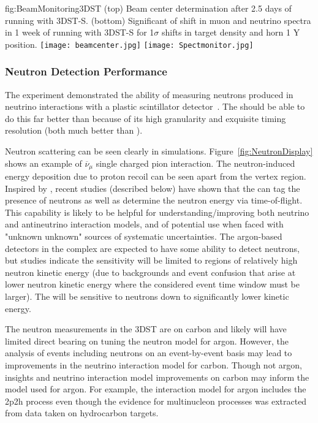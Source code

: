 \begin{dunefigure}{fig:BeamMonitoring3DST}
{(top) Beam center determination after 2.5 days of running with 3DST-S.  (bottom) Significant of shift in muon and neutrino spectra in 1 week of running with 3DST-S for 1$\sigma$ shifts in target density and horn 1 Y position.}
\texttt{[image: beamcenter.jpg]}
\texttt{[image: Spectmonitor.jpg]}
\end{dunefigure}

\subsubsection{Neutron Detection Performance}

The  experiment demonstrated the ability of measuring neutrons produced in neutrino interactions with a plastic scintillator detector~\cite{Elkins:2019vmy}. 
The  should be able to do this far better than  because of its high granularity and exquisite timing resolution (both much better than ). 

Neutron scattering can  be seen clearly in  simulations. 
Figure~\ref{fig:NeutronDisplay} shows an example of
$\overline{\nu}_{\mu}$   single charged pion interaction. The neutron-induced energy deposition due to proton recoil can be seen apart from the vertex region. 
Inspired by , recent studies (described below) have shown that the  can tag the presence of neutrons as well as determine the neutron energy via time-of-flight. 
This capability is likely to be helpful for 
understanding/improving both neutrino and antineutrino interaction models, and of potential use when faced with "unknown unknown" sources of systematic uncertainties. The argon-based detectors in the  complex are expected to have some ability to detect neutrons, but studies indicate the sensitivity will be limited to regions of relatively high neutron kinetic energy (due to backgrounds and event confusion that arise at lower neutron kinetic energy where the considered event time window must be larger).  The  will be sensitive to neutrons down to significantly lower kinetic energy. 

The neutron measurements in the 3DST are on carbon and likely will have limited direct bearing on tuning the neutron model for argon.  However, the analysis of events including neutrons on an event-by-event basis may lead to improvements in the neutrino interaction model for carbon.  Though not argon, insights and neutrino interaction model improvements on carbon may inform the model used for argon.  For example, the interaction model for argon includes the 2p2h process even though the evidence for multinucleon processes was extracted from data taken on hydrocarbon targets.


